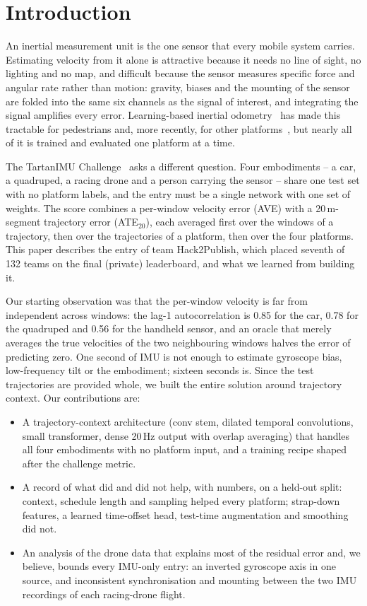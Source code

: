 \documentclass[letterpaper,10pt,conference]{ieeeconf}
\begin{document}
\section{Introduction}
An inertial measurement unit is the one sensor that every mobile system carries. Estimating velocity from it alone is
attractive because it needs no line of sight, no lighting and no map, and difficult because the sensor measures
specific force and angular rate rather than motion: gravity, biases and the mounting of the sensor are folded into the
same six channels as the signal of interest, and integrating the signal amplifies every error. Learning-based
inertial odometry~\cite{ronin,tlio,ionet} has made this tractable for pedestrians and, more recently, for other
platforms~\cite{airio,tartanimu}, but nearly all of it is trained and evaluated one platform at a time.

The TartanIMU Challenge~\cite{tartanimu} asks a different question. Four embodiments -- a car, a quadruped, a racing
drone and a person carrying the sensor -- share one test set with no platform labels, and the entry must be a
single network with one set of weights. The score combines a per-window velocity error (AVE) with a 20\,m-segment
trajectory error (ATE$_{20}$), each averaged first over the windows of a trajectory, then over the trajectories of a
platform, then over the four platforms. This paper describes the entry of team Hack2Publish, which placed seventh of
132 teams on the final (private) leaderboard, and what we learned from building it.

Our starting observation was that the per-window velocity is far from independent across windows: the lag-1
autocorrelation is 0.85 for the car, 0.78 for the quadruped and 0.56 for the handheld sensor, and an oracle that
merely averages the true velocities of the two neighbouring windows halves the error of predicting zero. One second
of IMU is not enough to estimate gyroscope bias, low-frequency tilt or the embodiment; sixteen seconds is. Since the
test trajectories are provided whole, we built the entire solution around trajectory context. Our contributions are:
\begin{itemize}
    \item A trajectory-context architecture (conv stem, dilated temporal convolutions, small transformer, dense
    20\,Hz output with overlap averaging) that handles all four embodiments with no platform input, and a training
    recipe shaped after the challenge metric.
    \item A record of what did and did not help, with numbers, on a held-out split: context, schedule length and
    sampling helped every platform; strap-down features, a learned time-offset head, test-time augmentation and
    smoothing did not.
    \item An analysis of the drone data that explains most of the residual error and, we believe, bounds every
    IMU-only entry: an inverted gyroscope axis in one source, and inconsistent synchronisation and mounting between
    the two IMU recordings of each racing-drone flight.
\end{itemize}
\end{document}
